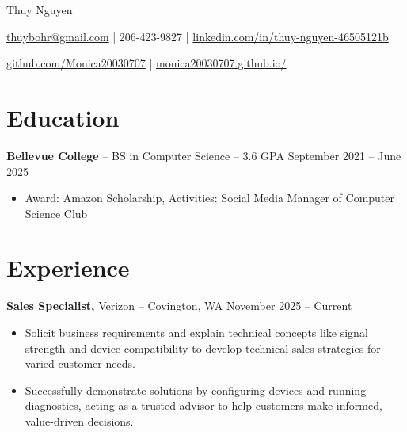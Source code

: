 \documentclass[11pt]{article}       %
\begin{document}
\centerline{\Huge Thuy Nguyen}

\vspace{5pt}

\centerline{\href{mailto:thuybohr@gmail.com}{thuybohr@gmail.com} | 206-423-9827 |
\href{https://www.linkedin.com/in/thuy-nguyen-46505121b/}{linkedin.com/in/thuy-nguyen-46505121b}}

\centerline{\href{https://github.com/Monica20030707}{github.com/Monica20030707} | 
\href{https://monica20030707.github.io/}{monica20030707.github.io/}} 

\vspace{-9pt}

\section*{Education}
\textbf{Bellevue College} -- BS in Computer Science -- 3.6 GPA \hfill September 2021 -- June 2025\\
\vspace{-9pt}
\begin{itemize}
  \item Award: Amazon Scholarship, Activities: Social Media Manager of Computer Science Club
\end{itemize}

\vspace{-18.5pt}

\section*{Experience}

\textbf{Sales Specialist,} {Verizon} -- Covington, WA \hfill November 2025 -- Current \\
\vspace{-9pt}
\begin{itemize}
  \item Solicit business requirements and explain technical concepts like signal strength and device compatibility to develop technical sales strategies for varied customer needs.
  \item Successfully demonstrate solutions by configuring devices and running diagnostics, acting as a trusted advisor to help customers make informed, value-driven decisions.
\end{itemize}
\end{document}
